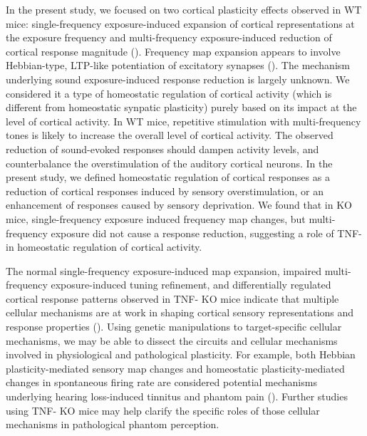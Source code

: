 In the present study, we focused on two cortical plasticity effects observed in WT mice: single-frequency exposure-induced expansion of cortical representations at the exposure frequency and multi-frequency exposure-induced reduction of cortical response magnitude (\cite{Condon1991, Zhang2001, Pienkowski2012}). Frequency map expansion appears to involve Hebbian-type, LTP-like potentiation of excitatory synapses (\cite{Froemke2007, Sun2010}). The mechanism underlying sound exposure-induced response reduction is largely unknown. We considered it a type of homeostatic regulation of cortical activity (which is different from homeostatic synpatic plasticity) purely based on its impact at the level of cortical activity. In WT mice, repetitive stimulation with multi-frequency tones is likely to increase the overall level of cortical activity. The observed reduction of sound-evoked responses should dampen activity levels, and counterbalance the overstimulation of the auditory cortical neurons. In the present study, we defined homeostatic regulation of cortical responses as a reduction of cortical responses induced by sensory overstimulation, or an enhancement of responses caused by sensory deprivation. We found that in KO mice, single-frequency exposure induced frequency map changes, but multi-frequency exposure did not cause a response reduction, suggesting a role of TNF-\textalpha{} in homeostatic regulation of cortical activity.

The normal single-frequency exposure-induced map expansion, impaired multi-frequency exposure-induced tuning refinement, and differentially regulated cortical response patterns observed in TNF-\textalpha{} KO mice indicate that multiple cellular mechanisms are at work in shaping cortical sensory representations and response properties (\cite{Bear2003, Bear2003, Burrone2003, Turrigiano2004, Dan2006, Liu2007, Wu2008, Feldman2009}). Using genetic manipulations to target-specific cellular mechanisms, we may be able to dissect the circuits and cellular mechanisms involved in physiological and pathological plasticity. For example, both Hebbian plasticity-mediated sensory map changes and homeostatic plasticity-mediated changes in spontaneous firing rate are considered potential mechanisms underlying hearing loss-induced tinnitus and phantom pain (\cite{Eggermont2006, Yang2011a}). Further studies using TNF-\textalpha{} KO mice may help clarify the specific roles of those cellular mechanisms in pathological phantom perception.

\printbibliography